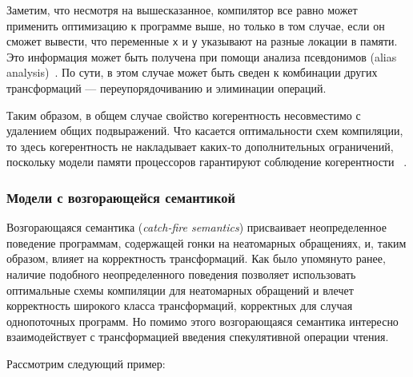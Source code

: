 Заметим, что несмотря на вышесказанное, компилятор 
все равно может применить оптимизацию \CSE к программе выше, 
но только в том случае, если он сможет вывести, что переменные \texttt{x} и \texttt{y} 
указывают на разные локации в памяти. 
Это информация может быть получена при помощи 
анализа псевдонимов (alias analysis)~\cite{Diwan-al:PLDI1998}.
По сути, в этом случае \CSE может быть сведен к 
комбинации других трансформаций --- переупорядочиванию и элиминации операций. 

Таким образом, в общем случае свойство когерентность
несовместимо с удалением общих подвыражений. 
Что касается оптимальности схем компиляции, 
то здесь когерентность не накладывает каких-то 
дополнительных ограничений, 
поскольку  модели памяти процессоров  
гарантируют соблюдение когерентности%
~\cite{Alglave-al:TOPLAS14, Sarkar-al:PLDI11, Sewell-al:CACM10, Lahav-al:PLDI17}. 

\subsubsection{Модели с возгорающейся семантикой}
\label{sec:analysis:ub}

Возгорающаяся семантика (\emph{catch-fire semantics}) присваивает 
неопределенное поведение программам, содержащей 
гонки на неатомарных обращениях, и, таким образом, влияет на корректность трансформаций. 
Как было упомянуто ранее, наличие подобного 
неопределенного поведения позволяет использовать
оптимальные схемы компиляции для неатомарных обращений
и влечет корректность широкого класса трансформаций, 
корректных для случая однопоточных программ. 
Но помимо этого возгорающаяся семантика 
интересно взаимодействует с трансформацией
введения спекулятивной операции чтения. 

Рассмотрим следующий пример:

